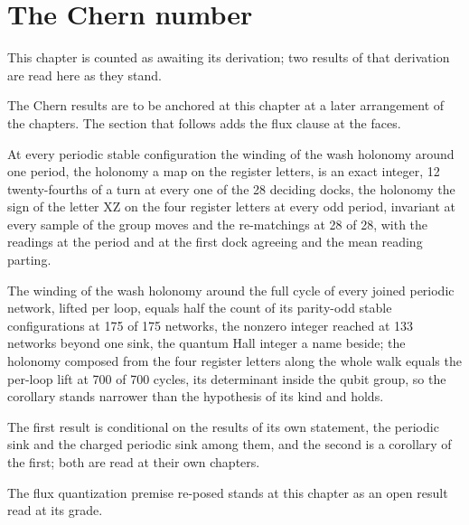 \section{The Chern number}\label{mod:XII-4-chern-number}
\begin{chtable}
This chapter is counted as awaiting its derivation; two results of that derivation are read here as they stand.
\end{chtable}
\chdeps{}{}
The Chern results are to be anchored at this chapter at a later arrangement of the chapters. The section that follows adds the flux clause at the faces.
\begin{chtheorem}
At every periodic stable configuration the winding of the wash holonomy around one period, the holonomy a map on the register letters, is an exact integer, 12 twenty-fourths of a turn at every one of the 28 deciding docks, the holonomy the sign of the letter XZ on the four register letters at every odd period, invariant at every sample of the group moves and the re-matchings at 28 of 28, with the readings at the period and at the first dock agreeing and the mean reading parting.
\end{chtheorem}
\chdeps{}{}
\begin{chtheorem}
The winding of the wash holonomy around the full cycle of every joined periodic network, lifted per loop, equals half the count of its parity-odd stable configurations at 175 of 175 networks, the nonzero integer reached at 133 networks beyond one sink, the quantum Hall integer a name beside; the holonomy composed from the four register letters along the whole walk equals the per-loop lift at 700 of 700 cycles, its determinant inside the qubit group, so the corollary stands narrower than the hypothesis of its kind and holds.
\end{chtheorem}
\chdeps{}{}
The first result is conditional on the results of its own statement, the periodic sink and the charged periodic sink among them, and the second is a corollary of the first; both are read at their own chapters.
\begin{chwall}
The flux quantization premise re-posed stands at this chapter as an open result read at its grade.
\end{chwall}
